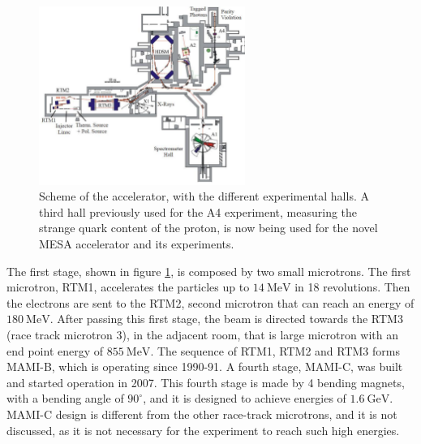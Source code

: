 \begin{figure}[hbtp]
\centering
\includegraphics[width = 0.6\textwidth]{ExperimentalSetup/Accelerator.pdf}
\caption{Scheme of the accelerator, with the different experimental halls. A third hall previously used for the A4 experiment, measuring the strange quark content of the proton, is now being used for the novel MESA accelerator and its experiments.}
\label{fig:Accelerator}
\end{figure}

The first stage, shown in figure \ref{fig:Accelerator}, is composed by two small microtrons. The first microtron, RTM1, accelerates the particles up to $\SI{14}{\mega \electronvolt}$ in 18 revolutions. Then the electrons are sent to the RTM2, second microtron that can reach an energy of $\SI{180}{\mega \electronvolt}$. After passing this first stage, the beam is directed towards the RTM3 (race track microtron 3), in the adjacent room, that is large microtron with an end point energy of $\SI{855}{\mega \electronvolt}$. The sequence of RTM1, RTM2 and RTM3 forms MAMI-B, which is operating since 1990-91. A fourth stage, MAMI-C, was built and started operation in 2007. This fourth stage is made by 4 bending magnets, with a bending angle of $90^{\circ}$, and it is designed to achieve energies of $\SI{1.6}{\giga \electronvolt}$. MAMI-C design is different from the other race-track microtrons, and it is not discussed, as it is not necessary for the experiment to reach such high energies.

